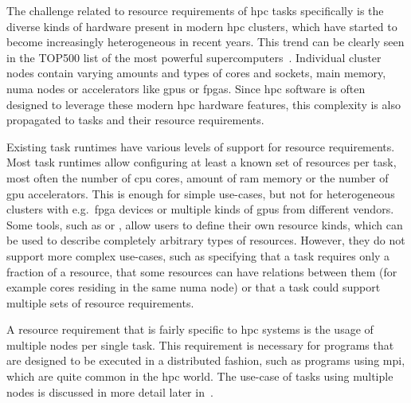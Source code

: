 The challenge related to resource requirements of \gls{hpc} tasks specifically is the
diverse kinds of hardware present in modern \gls{hpc} clusters, which have started to
become increasingly heterogeneous in recent years. This trend can be clearly seen in the TOP500
list of the most powerful supercomputers~\cite{top500analysis}. Individual cluster nodes contain
varying amounts and types of cores and sockets, main memory, \gls{numa} nodes or
accelerators like \glspl{gpu} or \glspl{fpga}. Since \gls{hpc}
software is often designed to leverage these modern \gls{hpc} hardware features, this
complexity is also propagated to tasks and their resource requirements.

Existing task runtimes have various levels of support for resource requirements. Most task runtimes
allow configuring at least a known set of resources per task, most often the number of
\gls{cpu} cores, amount of \gls{ram} memory or the number of
\gls{gpu} accelerators. This is enough for simple use-cases, but not for
heterogeneous clusters with e.g.\ \gls{fpga} devices or multiple kinds of
\glspl{gpu} from different vendors. Some tools, such as \dask{} or
\snakemake{}, allow users to define their own resource kinds, which can be used to
describe completely arbitrary types of resources. However, they do not support more complex
use-cases, such as specifying that a task requires only a fraction of a resource, that some
resources can have relations between them (for example cores residing in the same
\gls{numa} node) or that a task could support multiple sets of resource requirements.


A resource requirement that is fairly specific to \gls{hpc} systems is the usage of
multiple nodes per single task. This requirement is necessary for programs that are designed to be
executed in a distributed fashion, such as programs using \gls{mpi}, which are quite
common in the \gls{hpc} world. The use-case of tasks using multiple nodes is
discussed in more detail later in~.


